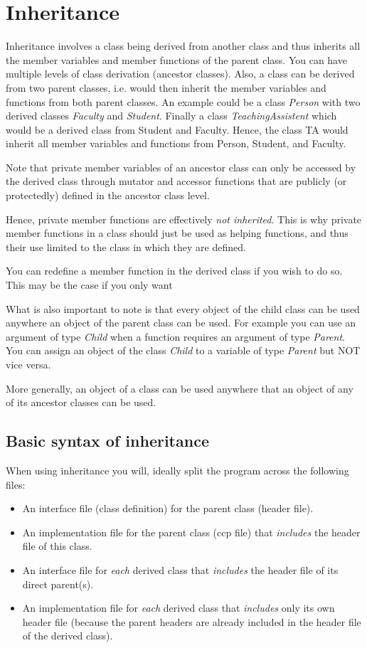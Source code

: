 \section{Inheritance}
Inheritance involves a class being derived from another class and thus
inherits all the member variables and member functions of the parent class.
You can have multiple levels of class derivation (ancestor classes). Also,
a class can be derived from two parent classes, i.e. would then inherit the
member variables and functions from both parent classes. An example could
be a class \emph{Person} with two derived classes \emph{Faculty} and
\emph{Student}. Finally a class \emph{TeachingAssistent} which would be a
derived class from Student and Faculty. Hence, the class TA would inherit all
member variables and functions from Person, Student, and Faculty.

Note that private member variables of an ancestor class can only be accessed
by the derived class through mutator and accessor functions that are publicly
(or protectedly) defined in the ancestor class level.

Hence, private member functions are effectively \emph{not inherited}. This is
why private member functions in a class should just be used as helping
functions, and thus their use limited to the class in which they are defined.

You can redefine a member function in the derived class if you wish to do so. This
may be the case if you only want 

What is also important to note is that every object of the child class can be used
anywhere an object of the parent class can be used. For example you can use
an argument of type \emph{Child} when a function requires an argument of type
\emph{Parent}. You can assign an object of the class \emph{Child} to a variable
of type \emph{Parent} but NOT vice versa.

More generally, an object of a class can be used anywhere that an object of any
of its ancestor classes can be used.


\subsection{Basic syntax of inheritance}
When using inheritance you will, ideally split the program across the following files:
\begin{itemize}
	\item An interface file (class definition) for the parent class (header file).
	\item An implementation file for the parent class (ccp file) that \emph{includes}
	the header file of this class.
	\item An interface file for \emph{each} derived class that \emph{includes} the
	header file of its direct parent(s).
	\item An implementation file for \emph{each} derived class that \emph{includes}
	only its own header file (because the parent headers are already included in the
	header file of the derived class).
\end{itemize}

